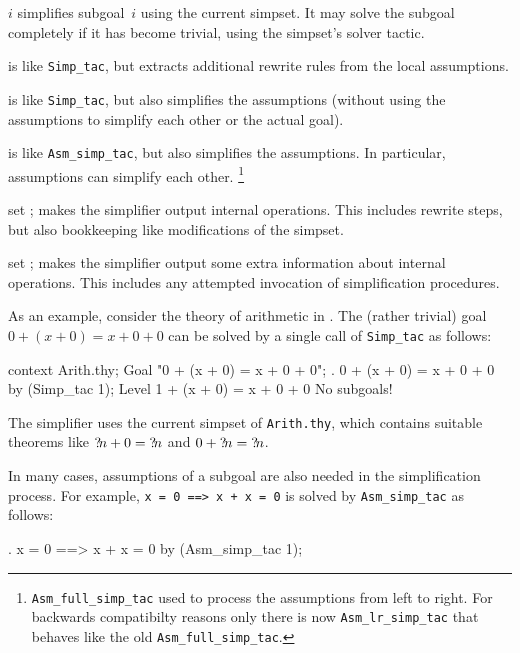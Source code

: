 \begin{ttdescription}
\item[\ttindexbold{Simp_tac} $i$] simplifies subgoal~$i$ using the
  current simpset.  It may solve the subgoal completely if it has
  become trivial, using the simpset's solver tactic.
  
\item[\ttindexbold{Asm_simp_tac}]
  is like \verb$Simp_tac$, but extracts additional rewrite rules from
  the local assumptions.
  
\item[\ttindexbold{Full_simp_tac}] is like \verb$Simp_tac$, but also
  simplifies the assumptions (without using the assumptions to
  simplify each other or the actual goal).
  
\item[\ttindexbold{Asm_full_simp_tac}] is like \verb$Asm_simp_tac$,
  but also simplifies the assumptions. In particular, assumptions can
  simplify each other.
\footnote{\texttt{Asm_full_simp_tac} used to process the assumptions from
  left to right. For backwards compatibilty reasons only there is now
  \texttt{Asm_lr_simp_tac} that behaves like the old \texttt{Asm_full_simp_tac}.}
\item[set \ttindexbold{trace_simp};] makes the simplifier output internal
  operations.  This includes rewrite steps, but also bookkeeping like
  modifications of the simpset.
\item[set \ttindexbold{debug_simp};] makes the simplifier output some extra
  information about internal operations.  This includes any attempted
  invocation of simplification procedures.
\end{ttdescription}

\medskip

As an example, consider the theory of arithmetic in \HOL.  The (rather
trivial) goal $0 + (x + 0) = x + 0 + 0$ can be solved by a single call
of \texttt{Simp_tac} as follows:
\begin{ttbox}
context Arith.thy;
Goal "0 + (x + 0) = x + 0 + 0";
{. 0 + (x + 0) = x + 0 + 0}
by (Simp_tac 1);
{\out Level 1}
{ + (x + 0) = x + 0 + 0}
{\out No subgoals!}
\end{ttbox}

The simplifier uses the current simpset of \texttt{Arith.thy}, which
contains suitable theorems like ${?\!n}+0 = {?\!n}$ and $0+{?\!n} =
{?\!n}$.

\medskip In many cases, assumptions of a subgoal are also needed in
the simplification process.  For example, \texttt{x = 0 ==> x + x = 0}
is solved by \texttt{Asm_simp_tac} as follows:
\begin{ttbox}
{. x = 0 ==> x + x = 0}
by (Asm_simp_tac 1);
\end{ttbox}

